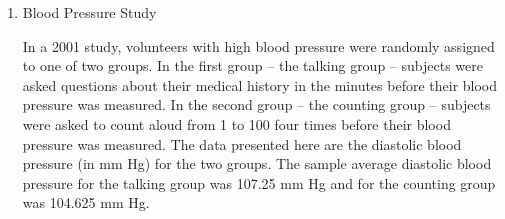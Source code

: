 \begin{enumerate}
\begin{enumerate}
\begin{key}
    {\it That she has no cancer, a false negative.}
\end{key}
   \item  Estimate that error rate using these data. 
\begin{students}
  \vspace{\fill}
\end{students} 

\begin{key}
{$90/160 =  .563 = 56.3\%$ \it That seems poor! }
\end{key}

If a patient tests positive for breast cancer, the patient may
experience extreme anxiety and may have a biopsy of breast tissue for
additional testing.  If patients exhibit the symptoms of the disease
but tests negative for breast cancer, this may result in the patient
being treated for a different condition. Untreated cancer can lead to
the tumor continuing to grow or spread. 
\item  Given the consequence of a false test result, is the
  false negative or false positive a larger problem in this case? Explain. 
\begin{students}
  \vspace{\fill}
\end{students} 

\begin{key}
  {\it I rate death from a cancer which should have been detected as
    more critical than the anxiety of a false positive, so I think
    false negatives are more important.}
\end{key}

\end{enumerate}

\begin{students}
\newpage
\end{students}

\item Blood Pressure Study
 
In a 2001 study, volunteers with high blood pressure were randomly
assigned to one of two groups. In the first group -- the talking group
-- subjects were asked questions about their medical history in the
minutes before their blood pressure was measured.  In the second group
-- the counting group -- subjects were asked to count aloud from 1 to
100 four times before their blood pressure was measured.  The data
presented here are the diastolic blood pressure (in mm Hg) for the two
groups.  The sample average diastolic blood pressure for the talking
group was 107.25 mm Hg and for the counting group was 104.625 mm Hg. 
            

\end{enumerate}
